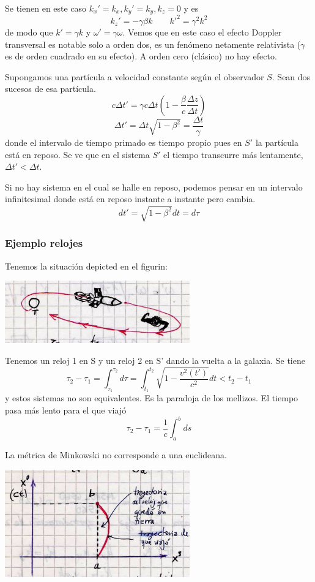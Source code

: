 \documentclass[10pt,oneside]{CBFT_book}
\begin{document}
Se tienen en este caso $k_x' = k_x,  k_y'= k_y , k_z = 0 $ y es
\[
	k_z'= - \gamma \beta k  \qquad 
	{k'}^2= \gamma^2 k^2
\]
de modo que $ k' = \gamma k $ y $ \omega' = \gamma \omega $.
Vemos que en este caso el efecto Doppler transversal es notable solo a orden dos, es un fenómeno
netamente relativista ($\gamma$ es de orden cuadrado en su efecto). A orden cero (clásico) no hay
efecto.

Supongamos una partícula a velocidad constante según el observador $S$. Sean dos sucesos de esa
partícula.
\[
	c \Delta t' =  \gamma c \Delta t \left( 1 - \frac{\beta}{c} \frac{\Delta z}{\Delta t} \right)
\]
\[
	\Delta t' = \Delta t \sqrt{1 - \beta^2} = \frac{\Delta t}{\gamma}
\]
donde el intervalo de tiempo primado es tiempo propio pues en $S'$ la partícula está en reposo.
Se ve que en el sistema $S'$ el tiempo transcurre más lentamente, $ \Delta t' < \Delta t $.

Si no hay sistema en el cual se halle en reposo, podemos pensar en un intervalo infinitesimal
donde está en reposo instante a instante pero cambia.
\[
	dt'=  \sqrt{ 1 - \beta^2 } dt = d\tau
\]

\subsubsection{Ejemplo relojes}

Tenemos la situación depicted en el figurin:

\includegraphics[width=0.6\textwidth]{images/fig_ft1_sperel_mellizos.jpg}

Tenemos un reloj 1 en S y un reloj 2 en S' dando la vuelta a la galaxia.
Se tiene
\[
	\tau_2 - \tau_1 = \int_{\tau_1}^{\tau_2} d\tau = 
	\int_{t_1}^{t_2} \sqrt{ 1 - \frac{v^2(t')}{c^2}} dt < t_2 - t_1
\]
y estos sistemas no son equivalentes. Es la paradoja de los mellizos.
El tiempo pasa más lento para el que viajó
\[
	\tau_2 - \tau_1 = \frac{1}{c} \int_{a}^{b} ds
\]

La métrica de Minkowski no corresponde a una euclideana.

\includegraphics[width=0.6\textwidth]{images/fig_ft1_sperel_mellizos2.jpg}
\end{document}

